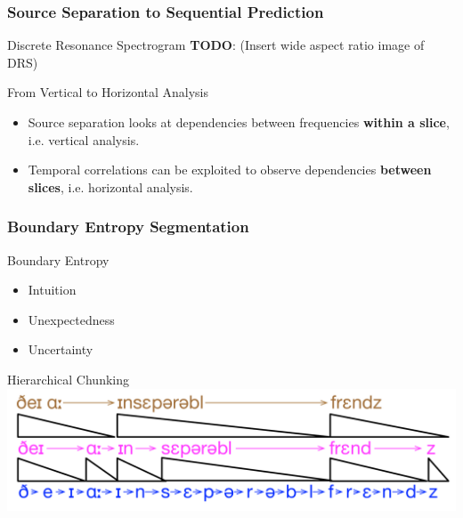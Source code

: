 \usetikzlibrary{arrows, positioning}

\begin{frame}
  \frametitle{Source Separation to Sequential Prediction}
  \begin{block}{Discrete Resonance Spectrogram}
    \textbf{TODO}: (Insert wide aspect ratio image of DRS)
  \end{block}
  \begin{block}{From Vertical to Horizontal Analysis}
    \begin{itemize}
      \item Source separation looks at dependencies between frequencies \textbf{within a slice}, i.e. vertical analysis.
      \item Temporal correlations can be exploited to observe dependencies \textbf{between slices}, i.e. horizontal analysis.
    \end{itemize}
  \end{block}
\end{frame}

\begin{frame}
  \frametitle{Boundary Entropy Segmentation}
  \begin{block}{Boundary Entropy}
    \begin{itemize}
      \item Intuition
      \item Unexpectedness
      \item Uncertainty
    \end{itemize}
  \end{block}
  \begin{block}{Hierarchical Chunking}
    \includegraphics[width=\textwidth]{images/phonetic-sequential-memory.png}
  \end{block}
\end{frame}

